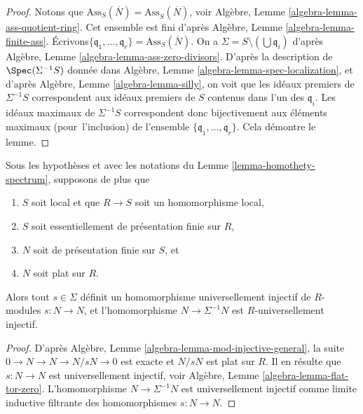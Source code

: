 \begin{proof}
Notons que
$\text{Ass}_S(\overline{N}) = \text{Ass}_{\overline{S}}(\overline{N})$, voir
Algèbre, Lemme \ref{algebra-lemma-ass-quotient-ring}.
Cet ensemble est fini d'après
Algèbre, Lemme \ref{algebra-lemma-finite-ass}.
Écrivons\newline $\{\mathfrak q_1, \ldots, \mathfrak q_r\} = \text{Ass}_S(\overline{N})$.
On a $\Sigma = S \setminus (\bigcup \mathfrak q_i)$ d'après
Algèbre, Lemme \ref{algebra-lemma-ass-zero-divisors}.
D'après la description de $\Spec(\Sigma^{-1}S)$ donnée dans
Algèbre, Lemme \ref{algebra-lemma-spec-localization},
et d'après
Algèbre, Lemme \ref{algebra-lemma-silly},
on voit que les idéaux premiers de $\Sigma^{-1}S$ correspondent aux idéaux premiers de
$S$ contenus dans l'un des $\mathfrak q_i$.
Les idéaux maximaux de $\Sigma^{-1}S$ correspondent donc bijectivement aux
éléments maximaux (pour\ l'inclusion) de l'ensemble
$\{\mathfrak q_1, \ldots, \mathfrak q_r\}$. Cela démontre le lemme.
\end{proof}

\begin{lemma}
\label{lemma-homothety-universally-injective}
Sous les hypothèses et avec les notations du
Lemme \ref{lemma-homothety-spectrum},
supposons de plus que
\begin{enumerate}
\item $S$ soit local et que $R \to S$ soit un homomorphisme local,
\item $S$ soit essentiellement de présentation finie sur $R$,
\item $N$ soit de présentation finie sur $S$, et
\item $N$ soit plat sur $R$.
\end{enumerate}
Alors tout $s \in \Sigma$ définit un
homomorphisme universellement injectif de $R$-modules $s : N \to N$, et
l'homomorphisme $N \to \Sigma^{-1}N$ est $R$-universellement injectif.
\end{lemma}

\begin{proof}
D'après
Algèbre, Lemme \ref{algebra-lemma-mod-injective-general},
la suite\newline $0 \to N \to N \to N/sN \to 0$ est exacte et
$N/sN$ est plat sur $R$. Il en résulte que $s : N \to N$
est universellement injectif, voir
Algèbre, Lemme \ref{algebra-lemma-flat-tor-zero}.
L'homomorphisme $N \to \Sigma^{-1}N$ est universellement injectif comme limite
inductive filtrante des homomorphismes $s : N \to N$.
\end{proof}

